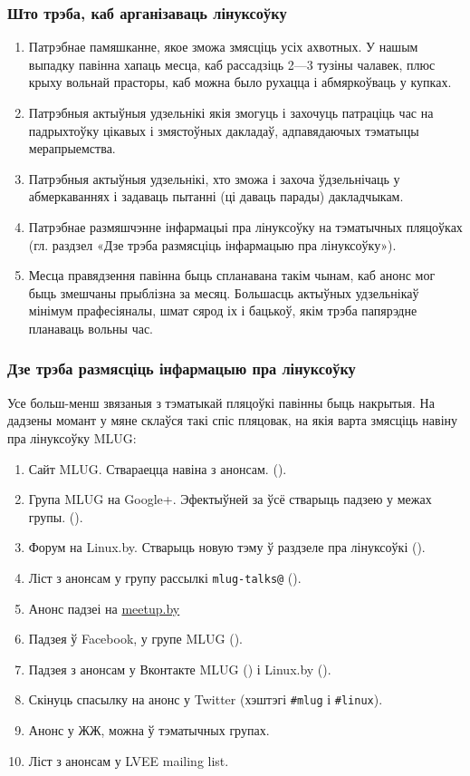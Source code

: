 \documentclass[10pt, a5paper]{article}
\def\vv!#1!{\texttt{#1}}
\begin{document}
\subsubsection*{Што трэба, каб арганізаваць лінуксоўку}

\begin{enumerate}
  \item Патрэбнае памяшканне, якое зможа змясціць усіх ахвотных. У нашым выпадку павінна хапаць месца, каб рассадзіць 2—3 тузіны чалавек, плюс крыху вольнай прасторы, каб можна было рухацца і абмяркоўваць у купках.
  \item Патрэбныя актыўныя удзельнікі якія змогуць і захочуць патраціць час на падрыхтоўку цікавых і змястоўных дакладаў, адпавядаючых тэматыцы мерапрыемства.
  \item Патрэбныя актыўныя удзельнікі, хто зможа і захоча ўдзельнічаць у абмеркаваннях і задаваць пытанні (ці даваць парады) дакладчыкам.
  \item Патрэбнае размяшчэнне інфармацыі пра лінуксоўку на тэматычных пляцоўках (гл. раздзел «Дзе трэба размясціць інфармацыю пра лінуксоўку»).
  \item Месца правядзення павінна быць спланавана такім чынам, каб анонс мог быць змешчаны прыблізна за месяц. Большасць актыўных удзельнікаў мінімум прафесіяналы, шмат сярод іх і бацькоў, якім трэба папярэдне планаваць вольны час.
\end{enumerate}

\subsubsection*{Дзе трэба размясціць інфармацыю пра лінуксоўку}

Усе больш-менш звязаныя з тэматыкай пляцоўкі павінны быць накрытыя. На дадзены момант у мяне склаўся такі спіс пляцовак, на якія варта змясціць навіну пра лінуксоўку MLUG:

\begin{enumerate}
  \item Сайт MLUG. Ствараецца навіна з анонсам. (\cite{mlug}).
  \item Група MLUG на Google+. Эфектыўней за ўсё стварыць падзею у межах групы. (\cite{mlug-gplus}).
  \item Форум на Linux.by. Стварыць новую тэму ў раздзеле пра лінуксоўкі (\cite{mlug-forum}).
  \item Ліст з анонсам у групу рассылкі \vv!mlug-talks@! (\cite{mlug-talks}).
  \item Анонс падзеі на \url{meetup.by}
  \item Падзея ў Facebook, у групе MLUG (\cite{mlug-fb}).
  \item Падзея з анонсам у  Вконтакте MLUG (\cite{mlug-vk-1}) і Linux.by (\cite{mlug-vk-2}).
  \item Скінуць спасылку на анонс у Twitter (хэштэгі \vv!\#mlug! і \vv!\#linux!).
  \item Анонс у ЖЖ, можна ў тэматычных групах.
  \item Ліст з анонсам у LVEE mailing list.
\end{enumerate}
\end{document}
